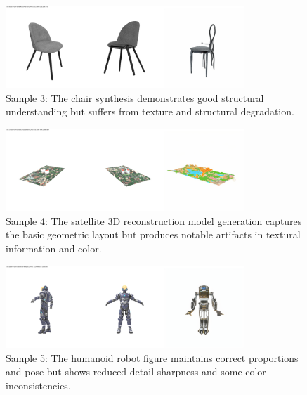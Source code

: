 \begin{figure}[htbp]
  \centering
  \includegraphics[width=0.8\textwidth, trim=0 0 0 20pt, clip]{images/experiments/samples/comparison_batch0016_uid_eea36014-cd41-58af-8b4d-126448a7661f.png}
  \caption{Sample 3: The chair synthesis demonstrates good structural understanding but suffers from texture and structural degradation.}
  \label{fig:sample_3}
\end{figure}

\begin{figure}[htbp]
  \centering
  \includegraphics[width=0.8\textwidth, trim=0 0 0 20pt, clip]{images/experiments/samples/comparison_batch0042_uid_2793d559-3f34-5cce-97e2-b708208e3661.png}
  \caption{Sample 4: The satellite 3D reconstruction model generation captures the basic geometric layout but produces notable artifacts in textural information and color.}
  \label{fig:sample_4}
\end{figure}

\begin{figure}[htbp]
  \centering
  \includegraphics[width=0.8\textwidth, trim=0 0 0 20pt, clip]{images/experiments/samples/comparison_batch0091_uid_a0a08413-ce59-574a-bf85-b87f8df6bde3.png}
  \caption{Sample 5: The humanoid robot figure maintains correct proportions and pose but shows reduced detail sharpness and some color inconsistencies.}
  \label{fig:sample_5}
\end{figure}

